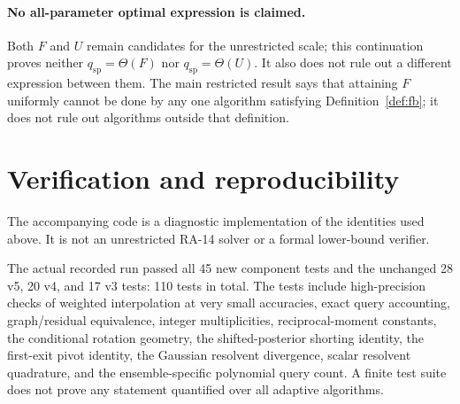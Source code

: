 \documentclass[11pt]{article}
\theoremstyle{definition}
\newcommand{\qsp}{q_{\mathrm{sp}}}
\begin{document}
\paragraph{No all-parameter optimal expression is claimed.}
Both $F$ and $U$ remain candidates for the unrestricted scale; this continuation proves neither $\qsp=\Theta(F)$ nor $\qsp=\Theta(U)$. It also does not rule out a different expression between them. The main restricted result says that attaining $F$ uniformly cannot be done by any one algorithm satisfying Definition~\ref{def:fb}; it does not rule out algorithms outside that definition.

\section{Verification and reproducibility}\label{sec:checks}
The accompanying code is a diagnostic implementation of the identities used above. It is not an unrestricted RA-14 solver or a formal lower-bound verifier.

The actual recorded run passed all 45 new component tests and the unchanged 28 v5, 20 v4, and 17 v3 tests: 110 tests in total. The tests include high-precision checks of weighted interpolation at very small accuracies, exact query accounting, graph/residual equivalence, integer multiplicities, reciprocal-moment constants, the conditional rotation geometry, the shifted-posterior shorting identity, the first-exit pivot identity, the Gaussian resolvent divergence, scalar resolvent quadrature, and the ensemble-specific polynomial query count. A finite test suite does not prove any statement quantified over all adaptive algorithms.
\end{document}
